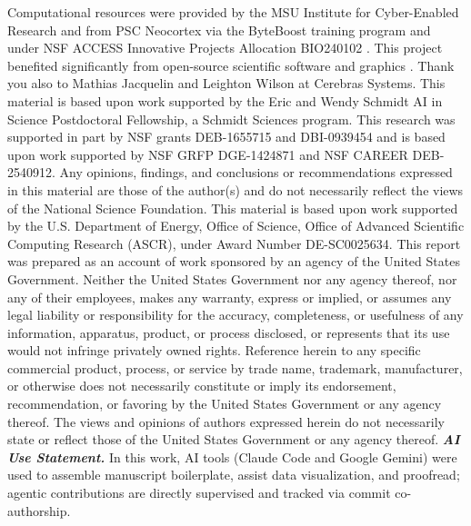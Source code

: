 \begin{acknowledgement}
\scriptsize
Computational resources were provided by the MSU Institute for Cyber-Enabled Research and from PSC Neocortex via the ByteBoost training program and under NSF ACCESS Innovative Projects Allocation BIO240102 \cite{buitrago2021neocortex,Boerner2023,Brashear2025}.
This project benefited significantly from open-source scientific software \cite{2020SciPy-NMeth,harris2020array,mckinney-proc-scipy-2010,waskom2021seaborn,hunter2007matplotlib,yang2025downstream,moreno2021signalgp,vostinar2024empirical,moreno2022hstrat,moreno2021conduit,moreno2024wse,moreno2026phyloframe} and graphics \cite{togopic2024_supercomputer,togopic2019_rackserver}.
Thank you also to Mathias Jacquelin and Leighton Wilson at Cerebras Systems.
This material is based upon work supported by the Eric and Wendy Schmidt AI in Science Postdoctoral Fellowship, a Schmidt Sciences program.
This research was supported in part by NSF grants DEB-1655715 and DBI-0939454 and is based upon work supported by NSF GRFP DGE-1424871 and NSF CAREER DEB-2540912.
Any opinions, findings, and conclusions or recommendations expressed in this material are those of the author(s) and do not necessarily reflect the views of the National Science Foundation.
This material is based upon work supported by the U.S. Department of Energy, Office of Science, Office of Advanced Scientific Computing Research (ASCR), under Award Number DE-SC0025634.
This report was prepared as an account of work sponsored by an agency of the United States Government.
Neither the United States Government nor any agency thereof, nor any of their employees, makes any warranty, express or implied, or assumes any legal liability or responsibility for the accuracy, completeness, or usefulness of any information, apparatus, product, or process disclosed, or represents that its use would not infringe privately owned rights.
Reference herein to any specific commercial product, process, or service by trade name, trademark, manufacturer, or otherwise does not necessarily constitute or imply its endorsement, recommendation, or favoring by the United States Government or any agency thereof.
The views and opinions of authors expressed herein do not necessarily state or reflect those of the United States Government or any agency thereof.
\textit{\textbf{AI Use Statement.}}
In this work, AI tools (Claude Code and Google Gemini) were used to assemble manuscript boilerplate, assist data visualization, and proofread; agentic contributions are directly supervised and tracked via commit co-authorship.
\end{acknowledgement}


